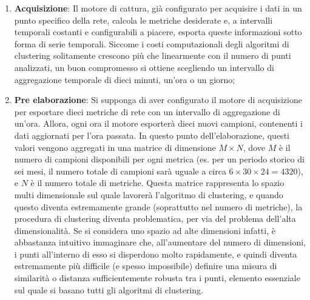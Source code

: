 \documentclass[12pt,a4paper,cucitura]{toptesi}
\begin{document}
\begin{enumerate}
\item \textbf{Acquisizione}: Il motore di cattura, già configurato per acquisire i dati in un punto specifico della rete, calcola le metriche desiderate e, a intervalli temporali costanti e configurabili a piacere, esporta queste informazioni sotto forma di serie temporali. Siccome i costi computazionali degli algoritmi di clustering solitamente crescono più che linearmente con il numero di punti analizzati, un buon compromesso si ottiene scegliendo un intervallo di aggregazione temporale di dieci minuti, un'ora o un giorno;
\item \textbf{Pre elaborazione}: Si supponga di aver configurato il motore di acquisizione per esportare dieci metriche di rete con un intervallo di aggregazione di un'ora. Allora, ogni ora il motore esporterà dieci nuovi campioni, contenenti i dati aggiornati per l'ora passata. In questo punto dell'elaborazione, questi valori vengono aggregati in una matrice di dimensione $M \times N$, dove $M$ è il numero di campioni disponibili per ogni metrica (es. per un periodo storico di sei mesi, il numero totale di campioni sarà uguale a circa $6 \times 30 \times 24 = 4320$), e $N$ è il numero totale di metriche. Questa matrice rappresenta lo spazio multi dimensionale sul quale lavorerà l'algoritmo di clustering, e quando questo diventa estremamente grande (soprattutto nel numero di metriche), la procedura di clustering diventa problematica, per via del problema dell'alta dimensionalità.
Se si considera uno spazio ad alte dimensioni infatti, è abbastanza intuitivo immaginare che, all'aumentare del numero di dimensioni, i punti all'interno di esso si disperdono molto rapidamente, e quindi diventa estremamente più difficile (e spesso impossibile) definire una misura di similarità o distanza sufficientemente robusta tra i punti, elemento essenziale sul quale si basano tutti gli algoritmi di clustering.


\end{enumerate}
\end{document}
